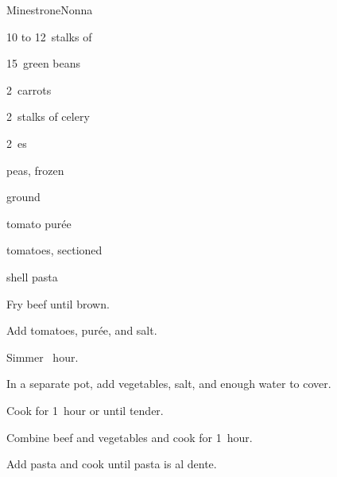 \begin{recipe}{Minestrone}{Nonna}{}

\begin{ingredients}
\item 10 to 12~stalks of 
\item 15~green beans
\item 2~carrots
\item 2~stalks of celery
\item 2~es
\item {} peas, frozen
\item \lbs{\half} ground 
\item {} tomato pur\'ee
\item tomatoes, sectioned
\item shell pasta
\end{ingredients}

\begin{directions}
\item Fry beef until brown.
\item Add tomatoes, pur\'ee, and salt.
\item Simmer \half~hour.
\item In a separate pot, add vegetables, salt, and enough water to cover.
\item Cook for 1~hour or until tender. 
\item Combine beef and vegetables and cook for 1~hour.
\item Add pasta and cook until pasta is al dente.
\end{directions}

\end{recipe}
